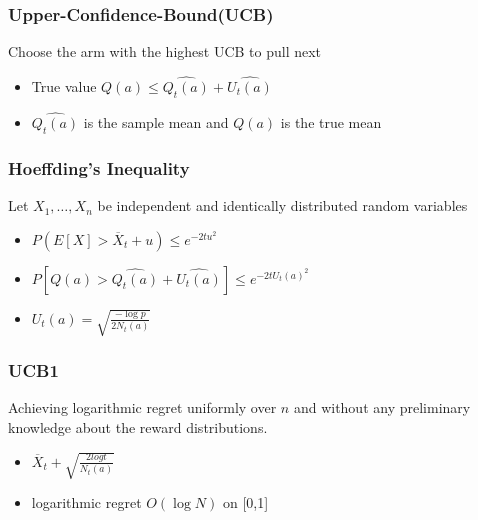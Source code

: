 \documentclass{beamer}
\title{}
\subtitle{}
\author{}
\institute{}
\date{}
\begin{document}
    \begin{frame}
        \frametitle{Upper-Confidence-Bound(UCB)}
        Choose the arm with the highest UCB to pull next

        \begin{itemize}
            \item<1-> True value $ Q(a)  \leq \widehat{Q_t (a)}+\widehat{U_t (a)} $
            \item<2->  $ \widehat{Q_t (a)}$ is the sample mean and $ Q(a)$ is the true mean
        \end{itemize}
    \end{frame}



    \begin{frame}
        \frametitle{Hoeffding’s Inequality}
        Let $X_1, \dots, X_n$ be independent and identically distributed random variables

        \begin{itemize}
            \item<1-> $ P(E[X] > \overline  X_t + u) \leq e^{-2t u^2}$
            \item<2-> $P[Q(a) >\widehat{Q_t (a)}+\widehat{U_t (a)}] \leq e^{-2t U_t(a)^2}$
            \item<3-> $U_t(a) = \sqrt{\frac{-\log p}{2N_t (a)}}$
        \end{itemize}
    \end{frame}



    \begin{frame}
        \frametitle{UCB1}
        Achieving logarithmic regret uniformly over $n$ and without any preliminary knowledge about the reward distributions.

        \begin{itemize}
            \item<1-> $\overline X_t + \sqrt{\frac{2log t}{N_t (a)}}$
            \item<2-> logarithmic regret $O(\log N)$ on [0,1]

        \end{itemize}
    \end{frame}
\end{document}
